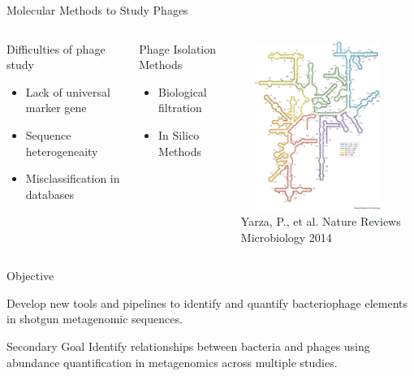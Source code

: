\documentclass[11pt]{beamer}
\begin{document}
	
	\begin{frame}{Molecular Methods to Study Phages}
	\begin{columns}
	\begin{block}{Difficulties of phage study}
	\begin{itemize}
		\item Lack of universal marker gene
		\item Sequence heterogeneaity 
		\item Misclassification in databases
	\end{itemize}
	\end{block}
		
		
	\begin{block}{Phage Isolation Methods}
	\begin{itemize}
		\item Biological filtration
		\item In Silico Methods
	\end{itemize}
	\end{block}
	
	\includegraphics[height=5.5cm, width=5cm]{ribosome.jpg} \\
	\tiny{Yarza, P., et al. Nature Reviews Microbiology 2014}
	\end{columns}
		
	
	\end{frame}

	
	\begin{frame}{Objective}
	
	Develop new tools and pipelines to identify and quantify bacteriophage elements in shotgun metagenomic sequences.
	
	\begin{block}{Secondary Goal}
	Identify relationships between bacteria and phages using abundance quantification in metagenomics across multiple studies. 
	\end{block}
	
	\end{frame}
\end{document}
